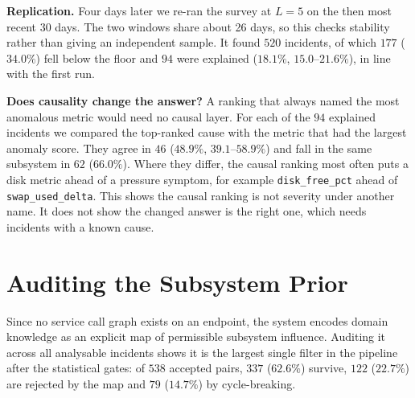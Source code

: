 \documentclass[conference]{IEEEtran}
\begin{document}
\textbf{Replication.} Four days later we re-ran the survey at $L=5$ on the
then most recent 30 days. The two windows share about 26 days, so this checks
stability rather than giving an independent sample. It found $520$
incidents, of which $177$ ($34.0\%$) fell below the floor and $94$ were
explained ($18.1\%$, $15.0$--$21.6\%$), in line with the first run.

\textbf{Does causality change the answer?} A ranking that always named the
most anomalous metric would need no causal layer. For each of the $94$
explained incidents we compared the top-ranked cause with the metric that had
the largest anomaly score. They agree in $46$ ($48.9\%$, $39.1$--$58.9\%$)
and fall in the same subsystem in $62$ ($66.0\%$). Where they differ, the
causal ranking most often puts a disk metric ahead of a pressure symptom, for
example \texttt{disk\_free\_pct} ahead of \texttt{swap\_used\_delta}.
This shows the causal ranking is not severity under another name. It does not
show the changed answer is the right one, which needs incidents with a known
cause.

\section{Auditing the Subsystem Prior}
\label{sec:topology}

Since no service call graph exists on an endpoint, the system encodes domain
knowledge as an explicit map of permissible subsystem influence. Auditing it
across all analysable incidents shows it is the largest single filter in the
pipeline after the statistical gates: of $538$ accepted pairs, $337$
($62.6\%$) survive, $122$ ($22.7\%$) are rejected by the map and $79$
($14.7\%$) by cycle-breaking.
\end{document}
